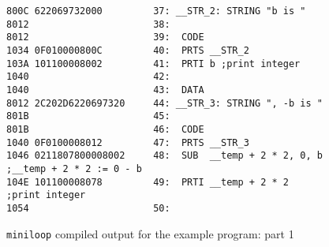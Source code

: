 \begin{figure}
\begin{minipage}{30cm}
\begin{verbatim}
800C 622069732000         37: __STR_2: STRING "b is "
8012                      38: 
8012                      39:  CODE
1034 0F010000800C         40:  PRTS __STR_2
103A 101100008002         41:  PRTI b ;print integer
1040                      42: 
1040                      43:  DATA
8012 2C202D6220697320     44: __STR_3: STRING ", -b is "
801B                      45: 
801B                      46:  CODE
1040 0F0100008012         47:  PRTS __STR_3
1046 0211807800008002     48:  SUB  __temp + 2 * 2, 0, b      ;__temp + 2 * 2 := 0 - b
104E 101100008078         49:  PRTI __temp + 2 * 2    ;print integer
1054                      50: 
\end{verbatim}
\end{minipage}
\caption{{\tt miniloop} compiled output for the example program: part 1}
\label{miniloop:assembler1}
\end{figure}
